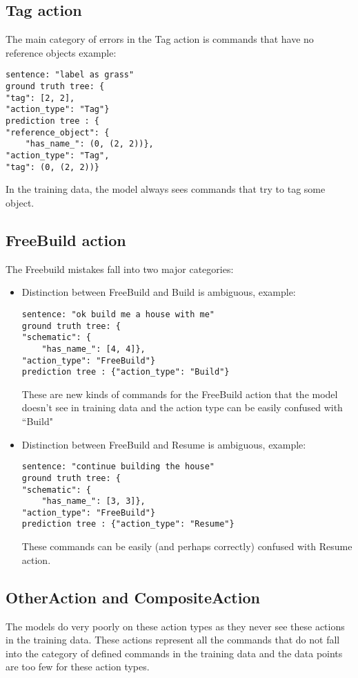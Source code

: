 \subsection{Tag action}
The main category of errors in the Tag action is commands that have no reference objects example:
\begin{verbatim}
sentence: "label as grass"
ground truth tree: {
"tag": [2, 2], 
"action_type": "Tag"}
prediction tree : {
"reference_object": {
    "has_name_": (0, (2, 2))}, 
"action_type": "Tag", 
"tag": (0, (2, 2))}
\end{verbatim}

In the training data, the model always sees commands that try to tag some object.

\subsection{FreeBuild action}
The Freebuild mistakes fall into two major categories:
\begin{itemize}
\item Distinction between FreeBuild and Build is ambiguous, example:
\begin{verbatim}
sentence: "ok build me a house with me"
ground truth tree: {
"schematic": {
    "has_name_": [4, 4]}, 
"action_type": "FreeBuild"}
prediction tree : {"action_type": "Build"}
\end{verbatim}
These are new kinds of commands for the FreeBuild action that the model doesn't see in training data and the action type can be easily confused with ``Build"
\item Distinction between FreeBuild and Resume is ambiguous, example:
\begin{verbatim}
sentence: "continue building the house"
ground truth tree: {
"schematic": {
    "has_name_": [3, 3]}, 
"action_type": "FreeBuild"}
prediction tree : {"action_type": "Resume"}
\end{verbatim}
These commands can be easily (and perhaps correctly) confused with Resume action.
\end{itemize}
 
 \subsection{OtherAction and CompositeAction}
 The models do very poorly on these action types as they never see these actions in the training data. 
 These actions represent all the commands that do not fall into the category of defined commands in the training data and the data points are too few for these action types. 
 
